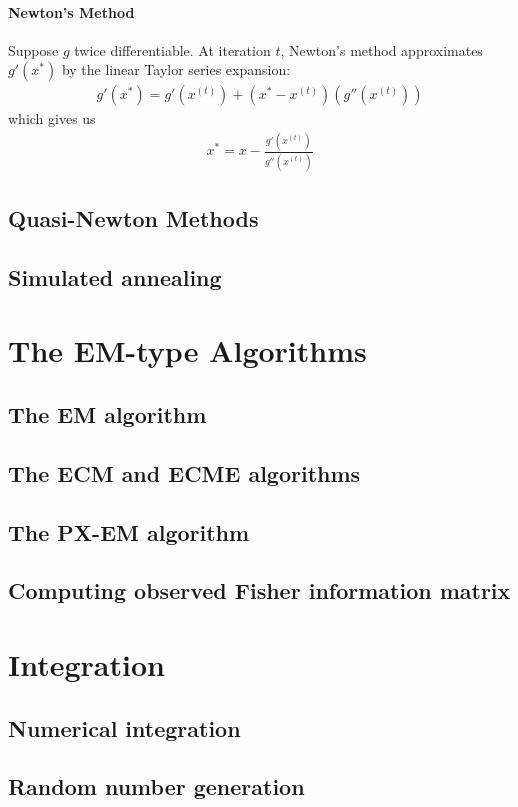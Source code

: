 \documentclass{report}
\begin{document}
\subsubsection{Newton's Method}
Suppose $g$ twice differentiable. At iteration $t$, Newton's method approximates $g'(x^*)$ by the linear Taylor series expansion:
\begin{align}
	g'(x^*) = g'(x^{(t)}) + (x^*-x^{(t)})(g''(x^{(t)}))
\end{align}
which gives us
\begin{align}
	x^* = x - \frac{g'(x^{(t)})}{g''(x^{(t)})}
\end{align}

\section{Quasi-Newton Methods}
\section{Simulated annealing}

\chapter{The EM-type Algorithms}
\section{The EM algorithm}
\section{The ECM and ECME algorithms}
\section{The PX-EM algorithm}
\section{Computing observed Fisher information matrix}

\chapter{Integration}
\section{Numerical integration}
\section{Random number generation}
\end{document}
